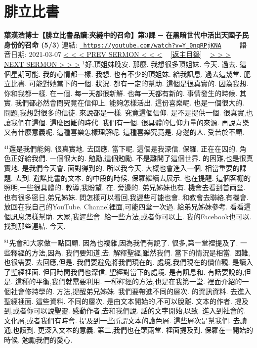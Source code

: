 \documentclass{book}
\begin{document}
\section{腓立比書}
\label{sec:Y_0nqRPjKNA}
\textbf{葉漢浩博士【腓立比書品讀:夾縫中的召命】第3課 ─ 在黑暗世代中活出天國子民身份的召命 (5/3)}
\newline
\newline
連結: \href{https://youtube.com/watch?v=Y_0nqRPjKNA}{\texttt{ https://youtube.com/watch?v=Y\_0nqRPjKNA}} ~~~~ 語音日期: 2021-03-07 
\newline
\newline
\hyperref[sec:mVawzgk9_PE]{\small{< < < PREV SERMON < < <}}
~
\hyperref[sec:index]{\small{[返主目錄]}}
~
\hyperref[sec:LLLLLQ816Zs]{\small{> > > NEXT SERMON > > >}}
\newline
\newline
$^{1}$好,頂姐妹晚安.
那麼.
我想很多頂姐妹.
今天.
過去.
這個星期可能.
我的心情都一樣.
我想.
也有不少的頂姐妹.
給我訊息.
過去這幾堂.
肥立比書.
可能對她當下的一個.
狀況.
都有一定的幫助.
這個是很真實的.
因為我想.
你和我都一樣.
在一個.
每一天都很新鮮.
也每一天都有新的.
事情發生的時候.
其實.
我們都必然會問究竟在信仰上.
能夠怎樣活出.
這份喜樂呢.
也是一個很大的.
問題,我想對很多的信徒.
來說都是一樣.
究竟這個信仰.
是不是提供一個.
很真實,也讓我們在這個.
這麼困難的時代.
我們有一個.
很具體的信仰力量的來源.
再說喜樂又有什麼意義呢.
這種喜樂怎樣理解呢.
這種喜樂究竟是.
身邊的人.
受苦於不顧.

$^{41}$還是我們能夠.
很真實地.
去回應.
當下呢.
這個是我深信.
保羅.
正在在囚的.
角色正好給我們.
一個很大的.
勉勵,這個勉勵.
不是離開了這個世界.
的困難,也是很真實地.
是我們今天會.
面對得到的.
所以我今天.
大概也會進入一個.
相當重要的課題.
去到.
避諾比書的文本.
的中段的時候.
保羅繼續去展示.
也在提醒.
這個客棚的照明,一些很具體的.
教導,我盼望.
在.
旁邊的.
弟兄姊妹也有.
機會去看到首兩堂.
也有很多密日,弟兄姊妹.
問怎樣可以看回,我遲些可能也會.
和教會去聯絡,有機會.
放回在我自己的YouTube.
Channel裡面,可能四堂一次過.
給弟兄姊妹參考.
看看這個訊息怎樣幫助.
大家,我遲些會.
給一些方法,或者你可以上.
我的Facebook也可以.
找到那些連結.
今天.

$^{81}$先會和大家做一點回顧.
因為也複雜,因為我們有說了.
很多,第一堂裡提及了.
一些釋經的方法,因為.
我們要知道,去.
解釋聖經,雖然我們.
當下的情況是相當.
困難,也很需要.
去回應,但是.
我們要避免將我們現在的.
處境,我們現在的價值觀.
是讀入了聖經裡面.
但同時間我們也深信.
聖經對當下的處境.
是有訊息和.
有話要說的,但是.
這種的平衡,我們就需要利用.
一種釋經的方法,也是在我第一堂.
裡面介紹的一個社會修持學的.
方法,提醒弟兄姊妹.
我們要帶進不同的層次.
的資訊資料.
去進入聖經裡面.
這些資料.
不同的層次.
是由文本開始的,不可以脫離.
文本的作者.
提及到,或者你可以說聖靈.
感動作者,去和我們說.
話的文字開始,以致.
進入到社會的.
文化層,或者我們有時會.
提及到一些所謂文本的護色層.
這些層次是幫我們.
去讀通,也讀到.
更深入文本的意義.
第二,我們也在頭兩堂.
裡面提及到.
保羅在一開始的時候.
勉勵我們的愛心.
\end{document}

